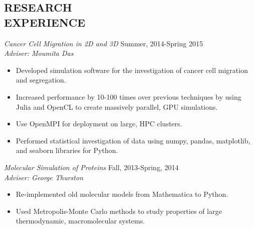 \documentclass[margin]{res}
\begin{document}
\begin{resume}



\section{RESEARCH\\EXPERIENCE}
  {\sl Cancer Cell Migration in 2D and 3D} \hfill  Summer, 2014-Spring 2015\\
  {\sl Adviser: Moumita Das}\\                
  \begin{itemize}
    \item Developed simulation software for the investigation of cancer cell migration
      and segregation.
    \item Increased performance by 10-100 times over previous techniques by using
      Julia and OpenCL to create massively parallel, GPU simulations.
    \item Use OpenMPI for deployment on large, HPC clusters.
    \item Performed statistical investigation of data using numpy, pandas, matplotlib, and seaborn libraries for Python.
  \end{itemize}

  {\sl Molecular Simulation of Proteins} \hfill   Fall, 2013-Spring, 2014 \\
  {\sl Adviser: George Thurston}\\                
  \begin{itemize}
    \item Re-implemented old molecular models from Mathematica to Python.
    \item Used Metropolis-Monte Carlo methods to study 
      properties of large thermodynamic, macromolecular systems.
  \end{itemize}
     




\end{resume}
\end{document}
